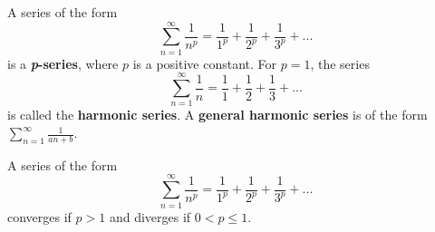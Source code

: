 \documentclass[addpoints, 12pt]{exam}
\begin{document}
\newpage

\begin{tcolorbox}[title= DEFINITION OF A $p$-SERIES,black,sharp corners,colback=white,colbacktitle=white,coltitle=black]

    A series of the form \[\displaystyle\sum_{n=1}^\infty \frac{1}{n^p}=\frac{1}{1^p}+\frac{1}{2^p}+\frac{1}{3^p}+...\] is a \textbf{\textit{p}-series}, where $p$ is a positive constant. For $p=1$, the series \[\sum_{n=1}^\infty\frac{1}{n}=\frac{1}{1}+\frac{1}{2}+\frac{1}{3}+...\]
    is called the \textbf{harmonic series}. A \textbf{general harmonic series} is of the form $\displaystyle\sum_{n=1}^\infty\frac{1}{an+b}$.

\end{tcolorbox}
\begin{tcolorbox}[title= CONVERGENCE OF A $p$-SERIES,black,sharp corners,colback=white,colbacktitle=white,coltitle=black]

    A series of the form \[\displaystyle\sum_{n=1}^\infty \frac{1}{n^p}=\frac{1}{1^p}+\frac{1}{2^p}+\frac{1}{3^p}+...\] converges if $p>1$ and diverges if $0<p\le1$.

\end{tcolorbox}
\vspace{.1cm}
\end{document}
